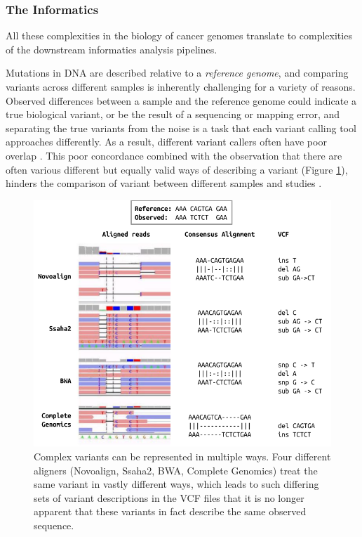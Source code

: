 \begin{justify}
\subsubsection{The Informatics}

All these complexities in the biology of cancer genomes translate to complexities of the downstream informatics analysis pipelines.

Mutations in DNA are described relative to a \emph{reference genome}, and comparing variants across different samples is inherently challenging for a variety of reasons. Observed differences between a sample and the reference genome could indicate a true biological variant, or be the result of a sequencing or mapping error, and separating the true variants from the noise is a task that each variant calling tool approaches differently. As a result, different variant callers often have poor overlap \cite{orawe2013, hwang2015systematic}. This poor concordance combined with the observation that there are often various different but equally valid ways of describing a variant (Figure \ref{fig:variant-multiple-representations}), hinders the comparison of variant between different samples and studies \cite{zook2014integrating}.

\begin{figure}[h!]
    \centering
    \includegraphics[width=400pt]{chapters/images/variant-representation-all.png}

    \caption{Complex variants can be represented in multiple ways. Four different aligners (Novoalign, Ssaha2, BWA, Complete Genomics) treat the same variant in vastly different ways, which leads to such differing sets of variant descriptions in the VCF files that it is no longer apparent that these variants in fact describe the same observed sequence.}
    \label{fig:variant-multiple-representations}
\end{figure}



\end{justify}

